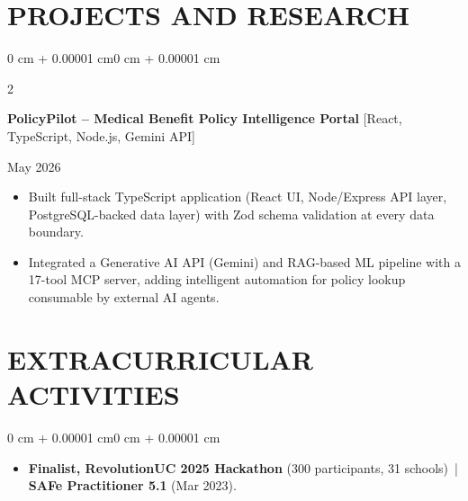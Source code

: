 \documentclass[10pt, letterpaper]{article}
\newenvironment{highlights}{
    \begin{itemize}[
        topsep=0.10 cm,
        parsep=0.06 cm,
        partopsep=0pt,
        itemsep=0.06 cm,
        leftmargin=12pt
    ]
}{
    \end{itemize}
}
\newenvironment{onecolentry}{
    \begin{adjustwidth}{0 cm + 0.00001 cm}{0 cm + 0.00001 cm}
}{
    \end{adjustwidth}
}
\newenvironment{twocolentry}[2][]{
    \onecolentry
    \def\secondColumn{#2}
    \setcolumnwidth{\fill, 4.5 cm}
    \begin{paracol}{2}
}{
    \switchcolumn \raggedleft \secondColumn
    \end{paracol}
    \endonecolentry
}
\begin{document}
\section{PROJECTS AND RESEARCH}
\begin{twocolentry}{May 2026}
\textbf{PolicyPilot -- Medical Benefit Policy Intelligence Portal} [React, TypeScript, Node.js, Gemini API]
\end{twocolentry}
\begin{highlights}
  \item Built full-stack TypeScript application (React UI, Node/Express API layer, PostgreSQL-backed data layer) with Zod schema validation at every data boundary.
  \item Integrated a Generative AI API (Gemini) and RAG-based ML pipeline with a 17-tool MCP server, adding intelligent automation for policy lookup consumable by external AI agents.
\end{highlights}

\section{EXTRACURRICULAR ACTIVITIES}
\begin{onecolentry}
\begin{highlights}
  \item \textbf{Finalist, RevolutionUC 2025 Hackathon} (300 participants, 31 schools) \,|\, \textbf{SAFe Practitioner 5.1} (Mar 2023).
\end{highlights}
\end{onecolentry}
\end{document}

